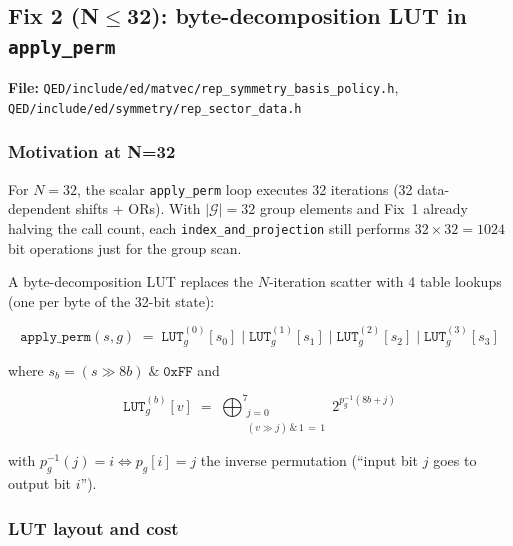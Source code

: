 \documentclass[11pt,a4paper]{article}
\begin{document}
\subsection{Fix 2 (N\texorpdfstring{$\le$}{<=}32): byte-decomposition LUT in \texttt{apply\_perm}}
\label{sec:fix2}

\textbf{File:} \texttt{QED/include/ed/matvec/rep\_symmetry\_basis\_policy.h},
\texttt{QED/include/ed/symmetry/rep\_sector\_data.h}

\subsubsection{Motivation at N=32}

For $N=32$, the scalar \texttt{apply\_perm} loop executes 32 iterations
(32 data-dependent shifts + ORs).  With $|\mathcal{G}|=32$ group elements
and Fix~1 already halving the call count, each \texttt{index\_and\_projection}
still performs $32 \times 32 = 1024$ bit operations just for the group scan.

A byte-decomposition LUT replaces the $N$-iteration scatter with 4 table
lookups (one per byte of the 32-bit state):

\begin{equation}
  \texttt{apply\_perm}(s, g) \;=\;
    \texttt{LUT}_g^{(0)}[s_0] \;\big|\;
    \texttt{LUT}_g^{(1)}[s_1] \;\big|\;
    \texttt{LUT}_g^{(2)}[s_2] \;\big|\;
    \texttt{LUT}_g^{(3)}[s_3]
  \label{eq:lut_apply}
\end{equation}

where $s_b = (s \gg 8b) \;\&\; \mathtt{0xFF}$ and

\begin{equation}
  \texttt{LUT}_g^{(b)}[v] \;=\;
    \bigoplus_{\substack{j=0 \\ (v \gg j)\,\&\,1\,=\,1}}^{7}
    2^{p_g^{-1}(8b+j)}
  \label{eq:lut_def}
\end{equation}

with $p_g^{-1}(j) = i \Leftrightarrow p_g[i] = j$ the inverse permutation
(``input bit $j$ goes to output bit $i$'').

\subsubsection{LUT layout and cost}
\end{document}
